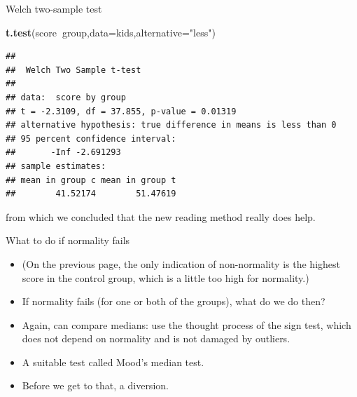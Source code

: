 \documentclass[ignorenonframetext,]{beamer}
\newenvironment{Shaded}{\begin{snugshade}}{\end{snugshade}}
\newcommand{\DataTypeTok}[1]{\textcolor[rgb]{0.13,0.29,0.53}{#1}}
\newcommand{\KeywordTok}[1]{\textcolor[rgb]{0.13,0.29,0.53}{\textbf{#1}}}
\newcommand{\NormalTok}[1]{#1}
\newcommand{\OperatorTok}[1]{\textcolor[rgb]{0.81,0.36,0.00}{\textbf{#1}}}
\newcommand{\StringTok}[1]{\textcolor[rgb]{0.31,0.60,0.02}{#1}}
\providecommand{\tightlist}{%
  \setlength{\itemsep}{0pt}\setlength{\parskip}{0pt}}
\begin{document}
\begin{frame}[fragile]{Welch two-sample test}
\protect\hypertarget{welch-two-sample-test}{}

\begin{Shaded}
\begin{Highlighting}[]
\KeywordTok{t.test}\NormalTok{(score}\OperatorTok{~}\NormalTok{group,}\DataTypeTok{data=}\NormalTok{kids,}\DataTypeTok{alternative=}\StringTok{"less"}\NormalTok{)}
\end{Highlighting}
\end{Shaded}

\begin{verbatim}
## 
##  Welch Two Sample t-test
## 
## data:  score by group
## t = -2.3109, df = 37.855, p-value = 0.01319
## alternative hypothesis: true difference in means is less than 0
## 95 percent confidence interval:
##       -Inf -2.691293
## sample estimates:
## mean in group c mean in group t 
##        41.52174        51.47619
\end{verbatim}

from which we concluded that the new reading method really does help.

\end{frame}

\begin{frame}{What to do if normality fails}
\protect\hypertarget{what-to-do-if-normality-fails}{}

\begin{itemize}
\tightlist
\item
  (On the previous page, the only indication of non-normality is the
  highest score in the control group, which is a little too high for
  normality.)
\item
  If normality fails (for one or both of the groups), what do we do
  then?
\item
  Again, can compare medians: use the thought process of the sign test,
  which does not depend on normality and is not damaged by outliers.
\item
  A suitable test called Mood's median test.
\item
  Before we get to that, a diversion.
\end{itemize}

\end{frame}
\end{document}
